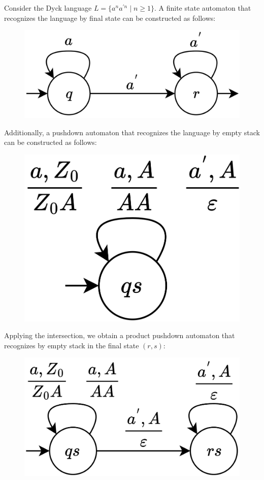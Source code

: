 \begin{example}
    Consider the Dyck language $L=\{a^na^{\prime n}\mid  n \geq 1\}$. 
    A finite state automaton that recognizes the language by final state can be constructed as follows:
    \begin{figure}[H]
        \centering
        \includegraphics[width=0.3\linewidth]{images/pdaint.png}
    \end{figure}
    Additionally, a pushdown automaton that recognizes the language by empty stack can be constructed as follows:
    \begin{figure}[H]
        \centering
        \includegraphics[width=0.25\linewidth]{images/pdaint1.png}
    \end{figure}
    Applying the intersection, we obtain a product pushdown automaton that recognizes by empty stack in the final state $(r,s)$: 
    \begin{figure}[H]
        \centering
        \includegraphics[width=0.3\linewidth]{images/pdaint2.png}
    \end{figure}
\end{example}